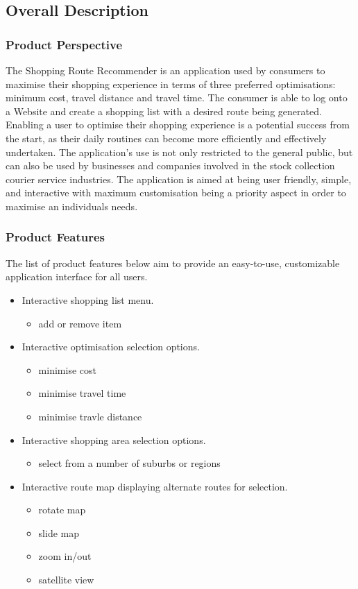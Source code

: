 \documentclass[10pt,twocolumn]{witseiepaper}
\begin{document}
	\subsection{Overall Description}
		
		\subsubsection{Product Perspective}
		
			The Shopping Route Recommender is an application used by consumers to maximise their shopping experience in terms of three preferred optimisations: minimum cost, travel distance and travel time. The consumer is able to log onto a Website and create a shopping list with a desired route being generated.  Enabling a user to optimise their shopping experience is a potential success from the start, as their daily routines can become more efficiently and effectively undertaken. The application's use is not only restricted to the general public, but can also be used by businesses and companies involved in the stock collection courier service industries. The application is aimed at being user friendly, simple, and interactive with maximum customisation being a priority aspect in order to maximise an individuals needs. 
		
		\subsubsection{Product Features}
		
			The list of product features below aim to provide an easy-to-use, customizable application interface for all users. 
		
			\begin{itemize}
				\item Interactive shopping list menu.
				\begin{itemize}
					\item add or remove item
				\end{itemize}
				\item Interactive optimisation selection options.
				\begin{itemize}
					\item minimise cost
					\item minimise travel time
					\item minimise travle distance
				\end{itemize}
				\item Interactive shopping area selection options.
				\begin{itemize}
					\item select from a number of suburbs or regions
				\end{itemize}
				\item Interactive route map displaying alternate routes for selection.
				\begin{itemize}
					\item rotate map
					\item slide map
					\item zoom in/out
					\item satellite view
				\end{itemize}
			\end{itemize}
		
\end{document}
